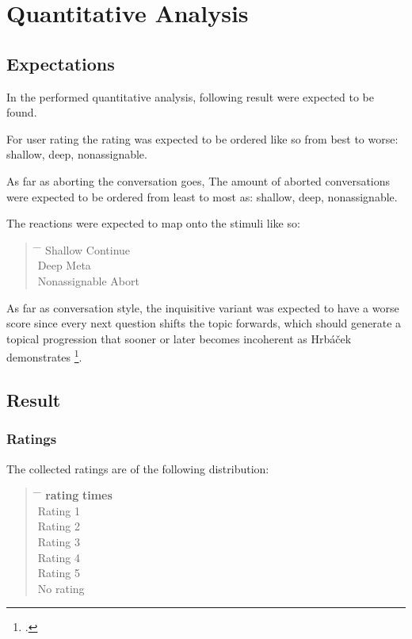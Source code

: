 


\chapter{Quantitative Analysis}

\section{Expectations}

In the performed quantitative analysis,
following result were expected to be found.

For user rating the rating was expected to be ordered like so from best to worse:
shallow, deep, nonassignable.

As far as aborting the conversation goes,
The amount of aborted conversations were expected to be ordered
from least to most as:
shallow, deep, nonassignable.

The reactions were expected to map onto the stimuli like so:

\begin{quote}
\begin{tabbing}
\hspace{4cm} \= \hspace{4cm} \= \kill %
Shallow \> Continue \\
Deep \> Meta \\
Nonassignable \> Abort \\
\end{tabbing}
\end{quote}

As far as conversation style, the inquisitive variant was expected to have a worse score
since every next question shifts the topic forwards, which should generate a topical progression
that sooner or later becomes incoherent as Hrbáček demonstrates \footcite[p.~30]{hrbacek1994}.

\section{Result}

\subsection{Ratings}

The collected ratings are of the following distribution:

\begin{quote}
\begin{tabbing}
\hspace{4cm} \= \hspace{4cm} \= \kill %
\textbf{rating} \> \textbf{times} \\
Rating 1  \\
Rating 2  \\
Rating 3  \\
Rating 4  \\
Rating 5  \\
No rating  \\
\end{tabbing}
\end{quote}

